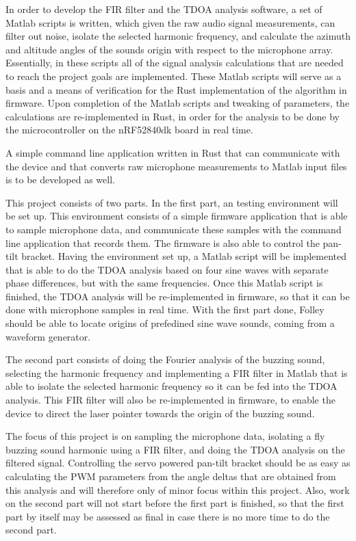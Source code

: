 \documentclass[a4paper]{article}
\begin{document}
In order to develop the FIR filter and the TDOA analysis software, a set of Matlab \cite{matlab} scripts is written, which given the raw audio signal measurements, can filter out noise, isolate the selected harmonic frequency, and calculate the azimuth and altitude angles of the sounds origin with respect to the microphone array. Essentially, in these scripts all of the signal analysis calculations that are needed to reach the project goals are implemented. These Matlab scripts will serve as a basis and a means of verification for the Rust implementation of the algorithm in firmware. Upon completion of the Matlab scripts and tweaking of parameters, the calculations are re-implemented in Rust, in order for the analysis to be done by the microcontroller on the nRF52840dk board in real time.

A simple command line application written in Rust that can communicate with the device and that converts raw microphone measurements to Matlab input files is to be developed as well.

This project consists of two parts. In the first part, an testing environment will be set up. This environment consists of a simple firmware application that is able to sample microphone data, and communicate these samples with the command line application that records them. The firmware is also able to control the pan-tilt bracket. Having the environment set up, a Matlab script will be implemented that is able to do the TDOA analysis based on four sine waves with separate phase differences, but with the same frequencies. Once this Matlab script is finished, the TDOA analysis will be re-implemented in firmware, so that it can be done with microphone samples in real time. With the first part done, Folley should be able to locate origins of prefedined sine wave sounds, coming from a waveform generator. 

The second part consists of doing the Fourier analysis of the buzzing sound, selecting the harmonic frequency and implementing a FIR filter in Matlab that is able to isolate the selected harmonic frequency so it can be fed into the TDOA analysis. This FIR filter will also be re-implemented in firmware, to enable the device to direct the laser pointer towards the origin of the buzzing sound.

The focus of this project is on sampling the microphone data, isolating a fly buzzing sound harmonic using a FIR filter, and doing the TDOA analysis on the filtered signal. Controlling the servo powered pan-tilt bracket should be as easy as calculating the PWM parameters from the angle deltas that are obtained from this analysis and will therefore only of minor focus within this project. Also, work on the second part will not start before the first part is finished, so that the first part by itself may be assessed as final in case there is no more time to do the second part.
\end{document}
